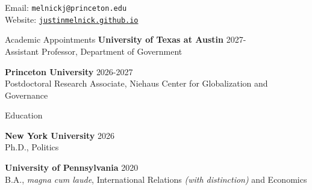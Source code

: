 \documentclass{resume} %
\begin{document}
\vspace*{-.35in}
 \begin{center}
Email: \texttt{melnickj@princeton.edu}\\
Website: \texttt{\href{https://justinmelnick.github.io}{justinmelnick.github.io}} \\
 \end{center}
 
 \smallskip
 
\begin{rSection}{Academic Appointments}
{\bf University of Texas at Austin} \hfill { 2027-} \\
Assistant Professor, Department of Government

\smallskip

{\bf Princeton University} \hfill { 2026-2027} 
\\Postdoctoral Research Associate, Niehaus Center for Globalization and Governance
\end{rSection}

\begin{rSection}{Education}

{\bf New York University} \hfill { 2026} \\
Ph.D., Politics 

\smallskip

{\bf University of Pennsylvania} \hfill { 2020} 
\\B.A., \emph{magna cum laude}, International Relations \emph{(with distinction)} and Economics
\end{rSection}
\end{document}
